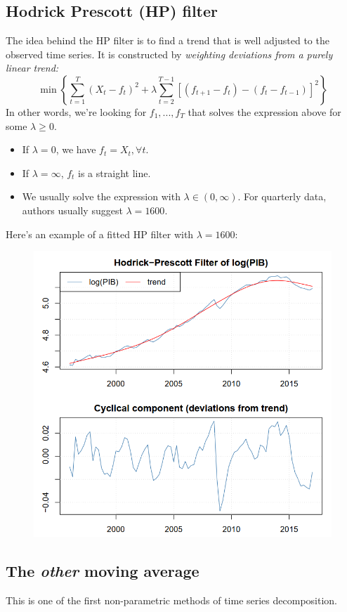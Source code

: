 \documentclass[11pt, a4paper]{report}
\theoremstyle{plain}
\theoremstyle{plain}
\theoremstyle{remark}
\begin{document}
\subsection{Hodrick Prescott (HP) filter}

The idea behind the HP filter is to find a trend that is well adjusted to the observed time series. It is constructed by \textit{weighting deviations from a purely linear trend:}
$$\min \left\{\sum_{t=1}^{T}\left(X_{t}-f_{t}\right)^{2}+\lambda \sum_{t=2}^{T-1}\left[\left(f_{t+1}-f_{t}\right)-\left(f_{t}-f_{t-1}\right)\right]^{2}\right\}$$
In other words, we're looking for $f_1,..., f_T$ that solves the expression above for some $\lambda \geq 0$. 
\begin{itemize}
	\item If $\lambda = 0$, we have $f_t = X_t, \forall t$.
	\item If $\lambda = \infty$, $f_t$ is a straight line.
	\item We usually solve the expression with $\lambda \in (0, \infty)$. For quarterly data, authors usually suggest $\lambda = 1600$.
\end{itemize}

Here's an example of a fitted HP filter with $\lambda = 1600$: 

\begin{figure}
	\centering
	\includegraphics[width=0.6\linewidth]{"hp filter 1600"}
	\label{fig:hp-filter-1600}
\end{figure}

\subsection{The \textit{other} moving average}

This is one of the first non-parametric methods of time series decomposition. 
\end{document}
